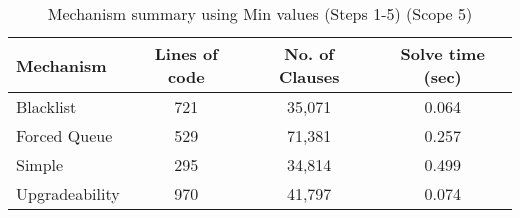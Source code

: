 \begin{table}[htbp]
\centering
\begin{tabular}{|l|c|c|c|}
\hline
\textbf{Mechanism} & \textbf{Lines of code} & \textbf{No. of Clauses} & \textbf{Solve time (sec)} \\
\hline
Blacklist & 721 & 35,071 & 0.064 \\
Forced Queue & 529 & 71,381 & 0.257 \\
Simple & 295 & 34,814 & 0.499 \\
Upgradeability & 970 & 41,797 & 0.074 \\
\hline
\end{tabular}
\caption{Mechanism summary using Min values (Steps 1-5) (Scope 5)}
\label{tab:mechanism_summary_min_steps_5}
\end{table}